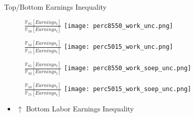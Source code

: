 \documentclass{beamer}
\let\oldcite=\cite
\renewcommand{\cite}[1]{\textcolor[rgb]{.0,.2,.7}{\oldcite{#1}}}
\begin{document}
\begin{frame}{Top/Bottom Earnings Inequality}
\begin{figure}[!t]
\centering
\begin{minipage}[b]{0.32\textwidth}{$\frac{\mathbb{P}_{85}[Earnings_t]}{\mathbb{P}_{50}[Earnings_t]}$}
\centering
\texttt{[image: perc8550\_work\_unc.png]}
\end{minipage}
\begin{minipage}[b]{0.32\textwidth}{$\frac{\mathbb{P}_{50}[Earnings_t]}{\mathbb{P}_{15}[Earnings_t]}$}
\centering
\texttt{[image: perc5015\_work\_unc.png]}
\end{minipage}
\end{figure}
\begin{figure}[!t]
\centering
\begin{minipage}[b]{0.32\textwidth}{$\frac{\mathbb{P}_{85}[Earnings_t]}{\mathbb{P}_{50}[Earnings_t]}$}
\centering
\texttt{[image: perc8550\_work\_soep\_unc.png]}
\end{minipage}
\begin{minipage}[b]{0.32\textwidth}{$\frac{\mathbb{P}_{50}[Earnings_t]}{\mathbb{P}_{15}[Earnings_t]}$}
\centering
\texttt{[image: perc5015\_work\_soep\_unc.png]}
\end{minipage}
\end{figure}
\begin{itemize}
\setlength{\itemsep}{0.7 cm}
\item $\uparrow$ Bottom Labor Earnings Inequality \cite{BoCo15}
\end{itemize}
\end{frame}
\end{document}
